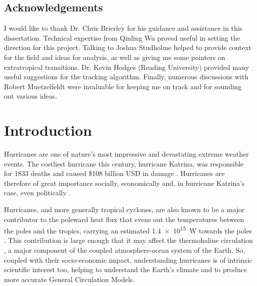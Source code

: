 \documentclass[pdftex,12pt,a4paper]{report}
\begin{document}
\section*{Acknowledgements}

I would like to thank Dr. Chris Brierley for his guidance and assistance in this dissertation.
Technical expertise from Qinling Wu proved useful in setting the direction for this project.
Talking to Joshua Studholme helped to provide context for the field and ideas for analysis, as well
as giving me some pointers on extratropical transitions. %
Dr. Kevin Hodges (Reading University) provided many useful suggestions for the tracking algorithm.
Finally, numerous discussions with Robert Muetzelfeldt were invaluable for keeping me on track and
for sounding out various ideas.

\newpage

\tableofcontents

\chapter{Introduction}


Hurricanes are one of nature's most impressive and devastating extreme weather events. The costliest
hurricane this century, hurricane Katrina, was responsible for 1833 deaths and caused \$108
billion USD in damage \parencite{knabb2006tropical}. %
Hurricanes are therefore of great importance socially,
economically and, in hurricane Katrina's case, even politically \parencite{kellner2007katrina}.

Hurricanes, and more generally tropical cyclones, are also known to be a major contributor to the
poleward heat flux that evens out the temperatures between the poles and the tropics, carrying an
estimated \SI{1.4e15}{W} towards the poles \parencite{emanuelContribution2001}. This
contribution is large enough that it may affect the thermohaline circulation
\parencite{hu2009effect}, a major component of the coupled atmosphere-ocean system of the Earth. So,
coupled with their socio-economic impact, understanding hurricanes is of intrinsic scientific
interest too, helping to understand the Earth's climate and to produce more accurate General
Circulation Models.
\end{document}
